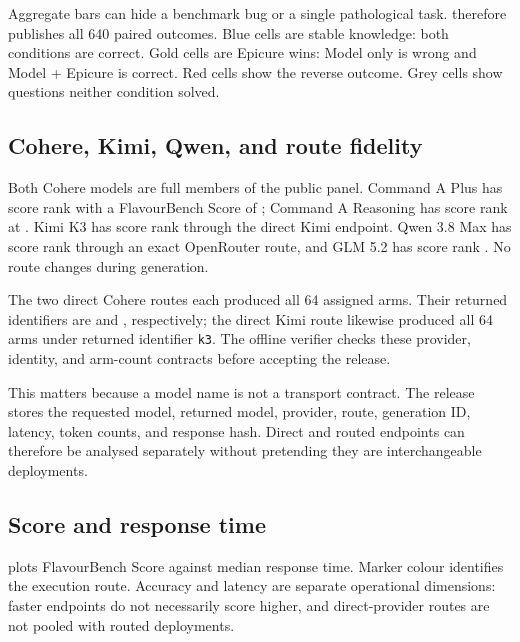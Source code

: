 \documentclass{article}
\begin{document}
Aggregate bars can hide a benchmark bug or a single pathological task.  therefore
publishes all 640 paired outcomes. Blue cells are stable knowledge: both conditions are correct.
Gold cells are Epicure wins: Model only is wrong and Model + Epicure is correct. Red cells show the
reverse outcome. Grey cells show questions neither condition solved.



\subsection{Cohere, Kimi, Qwen, and route fidelity}

Both Cohere models are full members of the public panel. Command A Plus has score rank
\FBCoherePlusRank{} with a FlavourBench Score of \FBCoherePlusScore{}; Command A Reasoning has
score rank \FBCohereReasoningRank{} at \FBCohereReasoningScore{}. Kimi K3 has score rank
\FBKimiRank{} through the direct Kimi endpoint. Qwen 3.8 Max has score rank \FBQwenRank{} through
an exact OpenRouter route, and GLM 5.2 has score rank \FBGLMRank{}. No route changes during
generation.

The two direct Cohere routes each produced all 64 assigned arms. Their returned identifiers are
\texttt{} and
\texttt{}, respectively; the direct Kimi route likewise
produced all 64 arms under returned identifier \texttt{k3}. The offline verifier checks these
provider, identity, and arm-count contracts before accepting the release.

This matters because a model name is not a transport contract. The release stores the requested
model, returned model, provider, route, generation ID, latency, token counts, and response hash.
Direct and routed endpoints can therefore be analysed separately without pretending they are
interchangeable deployments.

\subsection{Score and response time}

 plots FlavourBench Score against median response time. Marker colour identifies
the execution route. Accuracy and latency are separate operational dimensions: faster endpoints do
not necessarily score higher, and direct-provider routes are not pooled with routed deployments.
\end{document}
